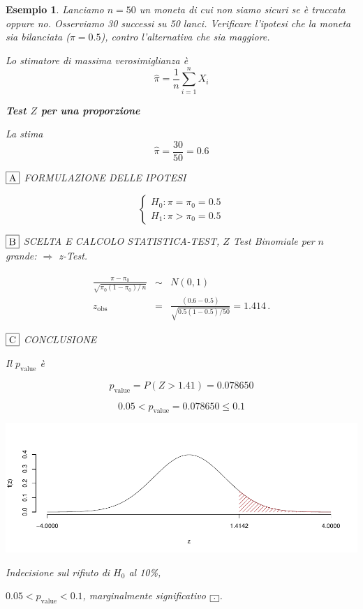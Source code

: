 \documentclass[
  11pt,
]{book}
\theoremstyle{mytheoremstyle}
\theoremstyle{mydefstyle}
\newtheorem{example}{{Esempio}}[section]
\begin{document}
\begin{example}
Lanciamo \(n=50\) un moneta di cui non siamo sicuri se è truccata oppure
no. Osserviamo 30 successi su 50 lanci. Verificare l'ipotesi che la moneta sia
bilanciata (\(\pi=0.5\)), contro l'alternativa che sia maggiore.

Lo stimatore di massima verosimiglianza è
\[\hat\pi=\frac 1 n \sum_{i=1}^n X_i\]

\textbf{Test \(Z\) per una proporzione}

La stima
\[\hat\pi=\frac { 30 } { 50 }= 0.6  \]

\(\fbox{A}\) FORMULAZIONE DELLE IPOTESI

\[\begin{cases}
   H_0: \pi = \pi_0=0.5 \\
   H_1: \pi > \pi_0=0.5 
   \end{cases}\]

\(\fbox{B}\) SCELTA E CALCOLO STATISTICA-TEST, \(Z\)
Test Binomiale per \(n\) grande: \(\Rightarrow\) z-Test.

\begin{eqnarray*}
   \frac{\hat\pi - \pi_{0}} {\sqrt {\pi_0(1-\pi_0)/\,n}}&\sim&N(0,1)\\
   z_{\text{obs}}
   &=& \frac{ ( 0.6 -  0.5 )} {\sqrt{ 0.5 (1- 0.5 )/ 50 }}
   =   1.414 \,.
   \end{eqnarray*}

\(\fbox{C}\) CONCLUSIONE

Il \(p_{\text{value}}\) è

\[ p_{\text{value}} = P(Z>1.41)=0.078650 \]

\[
 0.05 < p_\text{value}= 0.078650 \leq 0.1 
\]

\begin{center}\includegraphics{Appunti_di_Statistica_2025_files/figure-latex/15-test-mu-pi-9,-1} \end{center}

Indecisione sul rifiuto di \(H_0\) al 10\%,

\(0.05<p_\text{value}<0.1\), \emph{marginalmente significativo} \(\fbox{.}\).
\end{example}
\end{document}
